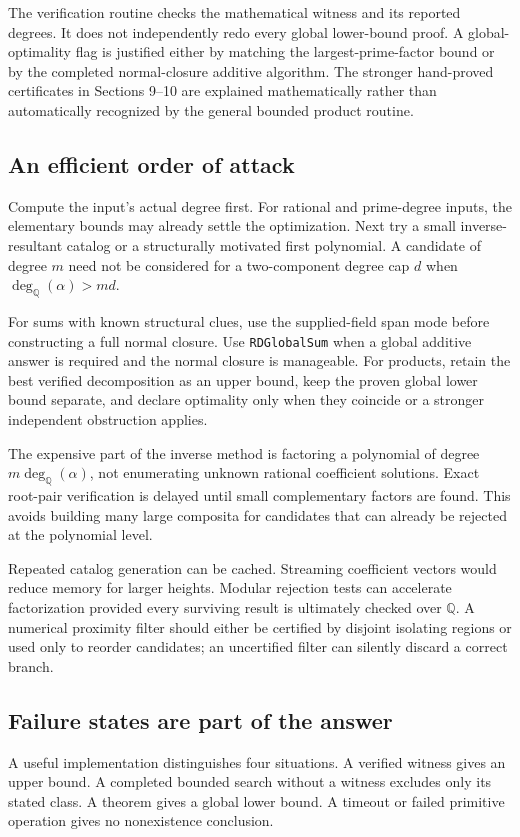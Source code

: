 \documentclass[11pt,letterpaper]{article}
\theoremstyle{definition}
\newcommand{\Q}{\mathbb Q}
\newcommand{\dq}{\deg_{\Q}}
\newcommand{\code}[1]{\texttt{#1}}
\begin{document}
The verification routine checks the mathematical witness and its reported degrees. It does not independently redo every global lower-bound proof. A global-optimality flag is justified either by matching the largest-prime-factor bound or by the completed normal-closure additive algorithm. The stronger hand-proved certificates in Sections 9--10 are explained mathematically rather than automatically recognized by the general bounded product routine.

\subsection{An efficient order of attack}
Compute the input's actual degree first. For rational and prime-degree inputs, the elementary bounds may already settle the optimization. Next try a small inverse-resultant catalog or a structurally motivated first polynomial. A candidate of degree $m$ need not be considered for a two-component degree cap $d$ when $\dq(\alpha)>md$.

For sums with known structural clues, use the supplied-field span mode before constructing a full normal closure. Use \code{RDGlobalSum} when a global additive answer is required and the normal closure is manageable. For products, retain the best verified decomposition as an upper bound, keep the proven global lower bound separate, and declare optimality only when they coincide or a stronger independent obstruction applies.

The expensive part of the inverse method is factoring a polynomial of degree $m\dq(\alpha)$, not enumerating unknown rational coefficient solutions. Exact root-pair verification is delayed until small complementary factors are found. This avoids building many large composita for candidates that can already be rejected at the polynomial level.

Repeated catalog generation can be cached. Streaming coefficient vectors would reduce memory for larger heights. Modular rejection tests can accelerate factorization provided every surviving result is ultimately checked over $\Q$. A numerical proximity filter should either be certified by disjoint isolating regions or used only to reorder candidates; an uncertified filter can silently discard a correct branch.

\subsection{Failure states are part of the answer}
A useful implementation distinguishes four situations. A verified witness gives an upper bound. A completed bounded search without a witness excludes only its stated class. A theorem gives a global lower bound. A timeout or failed primitive operation gives no nonexistence conclusion.
\end{document}

